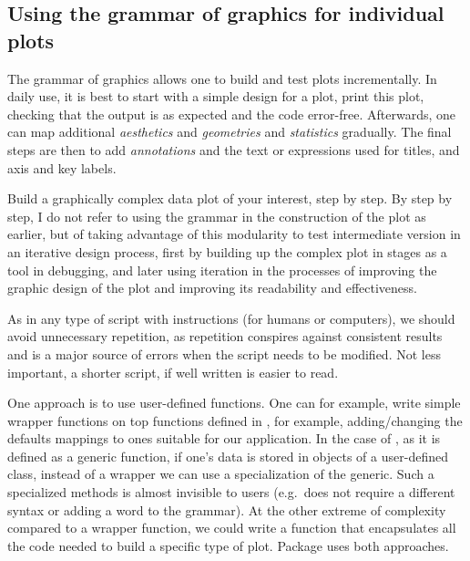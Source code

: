 \documentclass[krantz2]{krantz}\usepackage{knitr}%
\begin{document}
\subsection{Using the grammar of graphics for individual plots}\label{sec:plot:composition}

The grammar of graphics allows one to build and test plots incrementally. In daily use, it is best to start with a simple design for a plot, print this plot, checking that the output is as expected and the code error-free. Afterwards, one can map additional \emph{aesthetics} and \emph{geometries} and \emph{statistics} gradually. The final steps are then to add \emph{annotations} and the text or expressions used for titles, and axis and key labels.

\begin{playground}
  Build a graphically complex data plot of your interest, step by step. By step by step, I do not refer to using the grammar in the construction of the plot as earlier, but of taking advantage of this modularity to test intermediate version in an iterative design process, first by building up the complex plot in stages as a tool in debugging, and later using iteration in the processes of improving the graphic design of the plot and improving its readability and effectiveness.
\end{playground}

As in any type of script with instructions (for humans or computers), we should avoid unnecessary repetition, as repetition conspires against consistent results and is a major source of errors when the script needs to be modified. Not less important, a shorter script, if well written is easier to read.

One approach is to use user-defined functions. One can for example, write simple wrapper functions on top functions defined in \ggplot, for example, adding/changing the defaults mappings to ones suitable for our application. In the case of , as it is defined as a generic function, if one's data is stored in objects of a user-defined class, instead of a wrapper we can use a specialization of the generic. Such a specialized methods is almost invisible to users (e.g.\ does not require a different syntax or adding a word to the grammar). At the other extreme of complexity compared to a wrapper function, we could write a function that encapsulates all the code needed to build a specific type of plot. Package  uses both approaches.
\end{document}
